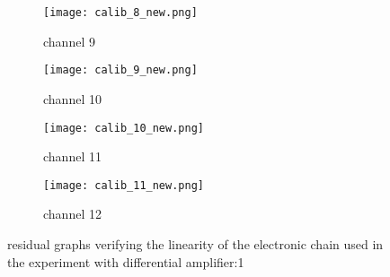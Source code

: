 \documentclass[a4paper, 11pt]{article}
\begin{document}
\begin{figure}[t]

\begin{subfigure}{0.5\textwidth}
\texttt{[image: calib\_8\_new.png]} 
\caption{channel 9}
\label{fig:subim1}
\end{subfigure}
\begin{subfigure}{0.5\textwidth}
\texttt{[image: calib\_9\_new.png]}
\caption{channel 10}
\label{fig:subim2}
\end{subfigure}

\begin{subfigure}{0.5\textwidth}
\texttt{[image: calib\_10\_new.png]} \caption{channel 11}
\label{fig:subim1}
\end{subfigure}
\begin{subfigure}{0.5\textwidth}
\texttt{[image: calib\_11\_new.png]}
\caption{channel 12}
\label{fig:subim2}
\end{subfigure}
 
\caption{residual graphs verifying the linearity of the electronic chain used in the experiment with differential amplifier:1}
\label{fig:image2}
\end{figure}
\end{document}
